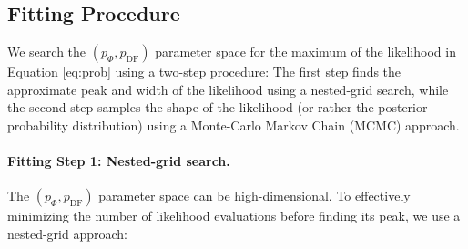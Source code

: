 \subsection{Fitting Procedure} \label{sec:fitting}

We search the $(p_\Phi,p_\text{DF})$ parameter space for the maximum of the likelihood in Equation \ref{eq:prob} using a two-step procedure: The first step finds the approximate peak and width of the likelihood using a nested-grid search, while the second step samples the shape of the likelihood (or rather the posterior probability distribution) using a Monte-Carlo Markov Chain (MCMC) approach.

\paragraph{Fitting Step 1: Nested-grid search.} The $(p_\Phi,p_\text{DF})$ parameter space can be high-dimensional. To effectively minimizing the number of likelihood evaluations before finding its peak, we use a nested-grid approach:
